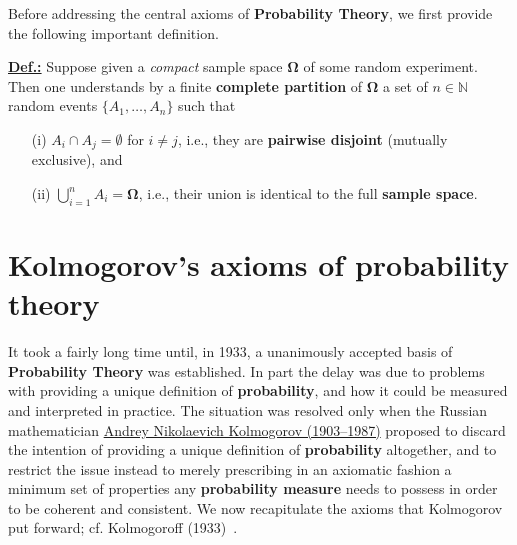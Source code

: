 \medskip
\noindent
Before addressing the central axioms of \textbf{Probability
Theory}, we first provide the following important definition.

\medskip
\noindent
\underline{\textbf{Def.:}} Suppose given a \textit{compact} sample
space $\boldsymbol{\Omega}$ of some random experiment. Then one 
understands by a finite \textbf{complete partition} of 
$\boldsymbol{\Omega}$ a set of $n \in \mathbb{N}$ random events 
$\{A_{1}, \ldots, A_{n}\}$ such that
%
\begin{itemize}
\item[(i)] $A_{i} \cap A_{j} = \emptyset$ for $i \neq j$, i.e., 
they are \textbf{pairwise disjoint} (mutually exclusive), and 
\item[(ii)] $\displaystyle\bigcup_{i=1}^{n}A_{i} = 
\boldsymbol{\Omega}$, i.e., their union is identical to the full 
\textbf{sample space}.
\end{itemize}
%

\section[Kolmogorov's axioms of probability theory]{Kolmogorov's
axioms of probability theory}
It took a fairly long time until, in 1933, a unanimously accepted 
basis of \textbf{Probability Theory} was established. In part the 
delay was due to problems with providing a unique definition 
of \textbf{probability}, and how it could be measured and
interpreted in practice. The situation was resolved only when the
Russian mathematician
\href{http://www-history.mcs.st-and.ac.uk/Biographies/Kolmogorov.html}{Andrey Nikolaevich Kolmogorov (1903--1987)} proposed to discard 
the intention of providing a unique definition of
\textbf{probability} altogether, and to restrict the issue instead
to merely prescribing in an axiomatic fashion a minimum set of 
properties any \textbf{probability measure} needs to possess
in order to be coherent and consistent. We now recapitulate the 
axioms that Kolmogorov put forward; cf. Kolmogoroff 
(1933)~.

